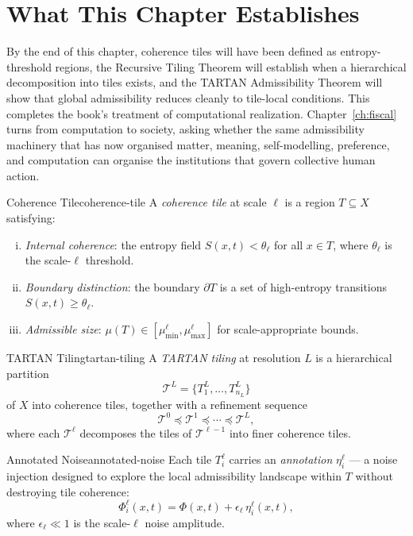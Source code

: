 \documentclass[12pt,twoside,openright]{book}
\begin{document}
\section{What This Chapter Establishes}
\label{sec:ch26-preview}

By the end of this chapter, coherence tiles will have been
defined as entropy-threshold regions, the Recursive Tiling
Theorem will establish when a hierarchical decomposition into
tiles exists, and the TARTAN Admissibility Theorem will show
that global admissibility reduces cleanly to tile-local
conditions. This completes the book's treatment of
computational realization. Chapter~\ref{ch:fiscal} turns from
computation to society, asking whether the same admissibility
machinery that has now organised matter, meaning,
self-modelling, preference, and computation can organise the
institutions that govern collective human action.

\begin{definition}{Coherence Tile}{coherence-tile}
  A \emph{coherence tile} at scale $\ell$ is a region
  $T \subseteq X$ satisfying:
  \begin{enumerate}[(i)]
    \item \emph{Internal coherence}: the entropy field
          $S(x, t) < \theta_\ell$ for all $x \in T$,
          where $\theta_\ell$ is the scale-$\ell$
          threshold.
    \item \emph{Boundary distinction}: the boundary
          $\partial T$ is a set of high-entropy transitions
          $S(x,t) \ge \theta_\ell$.
    \item \emph{Admissible size}: $\mu(T) \in
          [\mu_{\min}^\ell, \mu_{\max}^\ell]$ for
          scale-appropriate bounds.
  \end{enumerate}
\end{definition}

\begin{definition}{TARTAN Tiling}{tartan-tiling}
  A \emph{TARTAN tiling} at resolution $L$ is a
  hierarchical partition
  \[
    \mathcal{T}^L = \{T^L_1, \ldots, T^L_{n_L}\}
  \]
  of $X$ into coherence tiles, together with a
  refinement sequence
  \[
    \mathcal{T}^0 \preceq \mathcal{T}^1 \preceq
    \cdots \preceq \mathcal{T}^L,
  \]
  where each $\mathcal{T}^\ell$ decomposes the tiles of
  $\mathcal{T}^{\ell-1}$ into finer coherence tiles.
\end{definition}

\begin{definition}{Annotated Noise}{annotated-noise}
  Each tile $T^\ell_i$ carries an \emph{annotation}
  $\eta^\ell_i$ — a noise injection designed to
  explore the local admissibility landscape within $T$
  without destroying tile coherence:
  \[
    \Phi^\ell_i(x,t)
    = \Phi(x,t) + \epsilon_\ell \, \eta^\ell_i(x,t),
  \]
  where $\epsilon_\ell \ll 1$ is the scale-$\ell$
  noise amplitude.
\end{definition}
\end{document}
